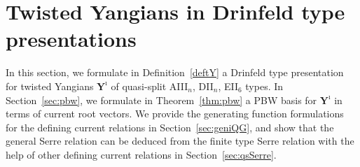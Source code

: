 \documentclass[11pt,reqno]{amsart}
\numberwithin{equation}{section}
\theoremstyle{definition}
\theoremstyle{remark}
\newcommand{\Yi}{{\mathbf{Y}^\imath}}
\begin{document}
\section{Twisted Yangians in Drinfeld type presentations}\label{sec:tY}
In this section, we formulate in Definition~\ref{deftY} a Drinfeld type presentation for twisted Yangians $\Yi$ of quasi-split AIII$_{n}$, DII$_{n}$, EII$_{6}$ types. In Section~\ref{sec:pbw}, we formulate in Theorem~\ref{thm:pbw} a PBW basis for $\Yi$ in terms of current root vectors. We provide the generating function formulations for the defining current relations in Section~\ref{sec:geniQG}, and show that the general Serre relation can be deduced from the finite type Serre relation with the help of other defining current relations in Section~\ref{sec:qsSerre}.
\end{document}
